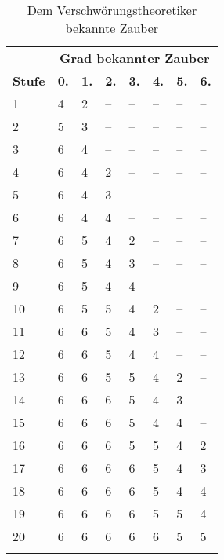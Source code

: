 \documentclass[
	ngerman,
	a4paper,
	11pt,
	twocolumn,
]{scrartcl}
\newlength{\thicktableline}
\newlength{\thintableline}
\newlength{\aboveline}
\newlength{\belowline}
\begin{document}
\begin{table}[htbp]
	\centering
	\caption{Dem Verschwörungstheoretiker bekannte Zauber}
	\label{tab:Verschwoerungstheoretiker_bekannt}
	\footnotesize
	\begin{tabularx}{0.4\textwidth}{lXXXXXXX}
		\multicolumn{1}{c}{}	&\multicolumn{7}{c}{\textbf{Grad bekannter Zauber}}	\\
		\textbf{Stufe}	&\textbf{0.}	&\textbf{1.}	&\textbf{2.}	&\textbf{3.}	&\textbf{4.}	&\textbf{5.}	&\textbf{6.}	\\	\specialrule{\thicktableline}{\aboveline}{\belowline}
		1	&4	&2	&--	&--	&--	&--	&--	\\	\specialrule{\thintableline}{\aboveline}{\belowline}
		2	&5	&3	&--	&--	&--	&--	&--	\\	\specialrule{\thintableline}{\aboveline}{\belowline}
		3	&6	&4	&--	&--	&--	&--	&--	\\	\specialrule{\thintableline}{\aboveline}{\belowline}
		4	&6	&4	&2	&--	&--	&--	&--	\\	\specialrule{\thintableline}{\aboveline}{\belowline}
		5	&6	&4	&3	&--	&--	&--	&--	\\	\specialrule{\thintableline}{\aboveline}{\belowline}
		6	&6	&4	&4	&--	&--	&--	&--	\\	\specialrule{\thintableline}{\aboveline}{\belowline}
		7	&6	&5	&4	&2	&--	&--	&--	\\	\specialrule{\thintableline}{\aboveline}{\belowline}
		8	&6	&5	&4	&3	&--	&--	&--	\\	\specialrule{\thintableline}{\aboveline}{\belowline}
		9	&6	&5	&4	&4	&--	&--	&--	\\	\specialrule{\thintableline}{\aboveline}{\belowline}
		10	&6	&5	&5	&4	&2	&--	&--	\\	\specialrule{\thintableline}{\aboveline}{\belowline}
		11	&6	&6	&5	&4	&3	&--	&--	\\	\specialrule{\thintableline}{\aboveline}{\belowline}
		12	&6	&6	&5	&4	&4	&--	&--	\\	\specialrule{\thintableline}{\aboveline}{\belowline}
		13	&6	&6	&5	&5	&4	&2	&--	\\	\specialrule{\thintableline}{\aboveline}{\belowline}
		14	&6	&6	&6	&5	&4	&3	&--	\\	\specialrule{\thintableline}{\aboveline}{\belowline}
		15	&6	&6	&6	&5	&4	&4	&--	\\	\specialrule{\thintableline}{\aboveline}{\belowline}
		16	&6	&6	&6	&5	&5	&4	&2	\\	\specialrule{\thintableline}{\aboveline}{\belowline}
		17	&6	&6	&6	&6	&5	&4	&3	\\	\specialrule{\thintableline}{\aboveline}{\belowline}
		18	&6	&6	&6	&6	&5	&4	&4	\\	\specialrule{\thintableline}{\aboveline}{\belowline}
		19	&6	&6	&6	&6	&5	&5	&4	\\	\specialrule{\thintableline}{\aboveline}{\belowline}
		20	&6	&6	&6	&6	&6	&5	&5	\\	\specialrule{\thicktableline}{\aboveline}{\belowline}
	\end{tabularx}
\end{table}
\end{document}
